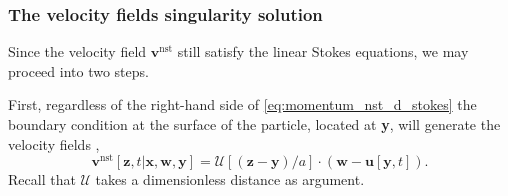 \subsubsection{The velocity fields singularity solution}

Since the velocity field $\textbf{v}^\text{nst}$ still satisfy the linear Stokes equations, we may proceed into two steps. 

First, regardless of the right-hand side of \ref{eq:momentum_nst_d_stokes} the boundary condition at the surface of the particle, located at \textbf{y}, will generate the velocity fields \citep{pozrikidis1992boundary}, 
\begin{equation}
    \textbf{v}^\text{nst}[\textbf{z},t|\textbf{x},\textbf{w},\textbf{y}]
    = 
    \mathcal{U}[(\textbf{z} - \textbf{y})/a]\cdot 
    (\textbf{w}- \textbf{u}[\textbf{y},t]).
    \label{eq:solution_isolated2}
\end{equation}
Recall that $\mathcal{U}$ takes a dimensionless distance as argument. 

